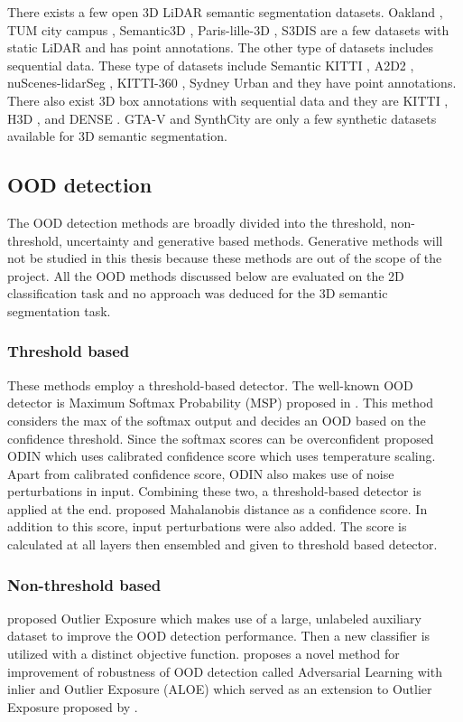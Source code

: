 \documentclass[thesis]{mas_proposal}
\begin{document}
There exists a few open 3D LiDAR semantic segmentation datasets. 
Oakland \cite{oakland}, TUM city campus \cite{gehrung2017approach_tum_campus}, Semantic3D \cite{hackel2017semantic3d}, Paris-lille-3D \cite{roynard2018paris}, S3DIS \cite{Armeni_2016_CVPR_S3DIS} are a few datasets with static LiDAR and has point annotations.
The other type of datasets includes sequential data.
These type of datasets include Semantic KITTI \cite{Behley_2019_ICCV}, A2D2 \cite{geyer2020a2d2}, nuScenes-lidarSeg \cite{caesar2020nuscenes}, KITTI-360 \cite{Xie_2016_CVPR_KITTI_360}, Sydney Urban \cite{de2013unsupervised} and they have point annotations.
There also exist 3D box annotations with sequential data and they are KITTI \cite{KITTI}, H3D \cite{H3D}, and DENSE \cite{Bijelic_2020_CVPR_DENSE}. %
GTA-V \cite{GTAV} and SynthCity \cite{griffiths2019synthcity} are only a few synthetic datasets available for 3D semantic segmentation.

\subsection{OOD detection}
The OOD detection methods are broadly divided into the threshold, non-threshold, uncertainty and generative based methods.
Generative methods will not be studied in this thesis because these methods are out of the scope of the project.
All the OOD methods discussed below are evaluated on the 2D classification task and no approach was deduced for the 3D semantic segmentation task.
\subsubsection{Threshold based}
These methods employ a threshold-based detector.
The well-known OOD detector is Maximum Softmax Probability (MSP) proposed in \cite{hendrycks2016baseline_MSP}. 
This method considers the max of the softmax output and decides an OOD based on the confidence threshold.
Since the softmax scores can be overconfident \cite{liang2017enhancing_ODIN} proposed ODIN which uses calibrated confidence score which uses temperature scaling.
Apart from calibrated confidence score, ODIN also makes use of noise perturbations in input.
Combining these two, a threshold-based detector is applied at the end. 
\cite{lee2018simple_mahalanobis} proposed Mahalanobis distance as a confidence score. 
In addition to this score, input perturbations were also added. 
The score is calculated at all layers then ensembled and given to threshold based detector.
\subsubsection{Non-threshold based}
\cite{hendrycks2018deep_OE} proposed Outlier Exposure which makes use of a large, unlabeled auxiliary dataset to improve the OOD detection performance. 
Then a new classifier is utilized with a distinct objective function. 
\cite{chen2020robust} proposes a novel method for improvement of robustness of OOD detection called Adversarial Learning with inlier and Outlier Exposure (ALOE) which served as an extension to Outlier Exposure proposed by \cite{hendrycks2018deep_OE}.
\end{document}

